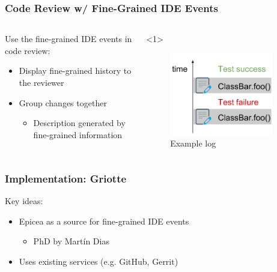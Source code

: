 \documentclass[aspectratio=169]{beamer}
\begin{document}
\begin{frame}[fragile]

\frametitle{Code Review w/ Fine-Grained IDE Events}

\begin{columns}

\begin{column}{0.5\textwidth}

Use the fine-grained IDE events in code review:

\begin{itemize}
\item Display fine-grained history to the reviewer
\item Group changes together
\begin{itemize}
\item Description generated by fine-grained information
\end{itemize}

\end{itemize}
\end{column}

\begin{column}{0.5\textwidth}

\begin{onlyenv}<1>
\begin{figure}
\begin{center}
\includegraphics[width=0.9\textwidth]{img/example_log.pdf}
\end{center}
\caption{Example log}
\end{figure}
\end{onlyenv}

\end{column}

\end{columns}

\end{frame}

\begin{frame}[fragile]

\frametitle{Implementation: Griotte}

Key ideas:

\begin{itemize}
\item Epicea as a source for fine-grained IDE events
\begin{itemize}
\item PhD by Mart\'{i}n Dias
\end{itemize}

\item Uses existing services (e.g. GitHub, Gerrit)
\end{itemize}
\end{frame}
\end{document}
